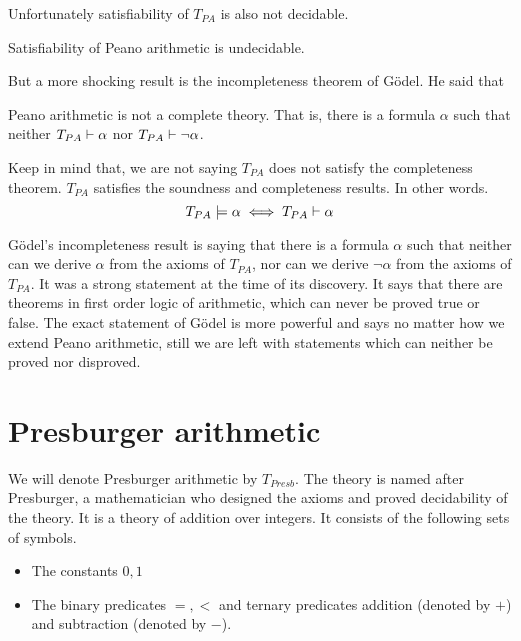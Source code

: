 Unfortunately satisfiability of $T_{PA}$ is also not decidable. 
\begin{theorem}
Satisfiability of Peano arithmetic is undecidable. 
\end{theorem}

But a more shocking result is the incompleteness theorem of G\"odel. He said that 
\begin{theorem}
Peano arithmetic is not a complete theory. That is, there is a formula $\alpha$ such that neither $T_{PA} \vdash \alpha$ nor $T_{PA} \vdash \neg \alpha$.
\end{theorem}

Keep in mind that, we are not saying $T_{PA}$ does not satisfy the completeness theorem. $T_{PA}$ satisfies the soundness and completeness results. In other words.
\[
T_{PA} \models \alpha \iff T_{PA} \vdash \alpha
\]

G\"odel's incompleteness result is saying that there is a formula $\alpha$ such that neither can we derive $\alpha$ from the axioms of $T_{PA}$, nor can we derive $\neg \alpha$ from the axioms of $T_{PA}$. It was a strong statement at the time of its discovery. It says that there are theorems in first order logic of arithmetic, which can never be proved true or false. The exact statement of G\"odel is more powerful and says no matter how we extend Peano arithmetic, still we are left with statements which can neither be proved nor disproved.  

\section{Presburger arithmetic}
We will denote Presburger arithmetic by $T_{Presb}$. The theory is named after Presburger, a mathematician who designed the axioms and proved decidability of the theory. It is a theory of addition over integers.  It consists of the following sets of symbols.
\begin{itemize}
\item The constants $0,1$
\item The binary predicates $=,<$ and ternary predicates addition (denoted by $+$) and subtraction (denoted by $-$).
\end{itemize}

